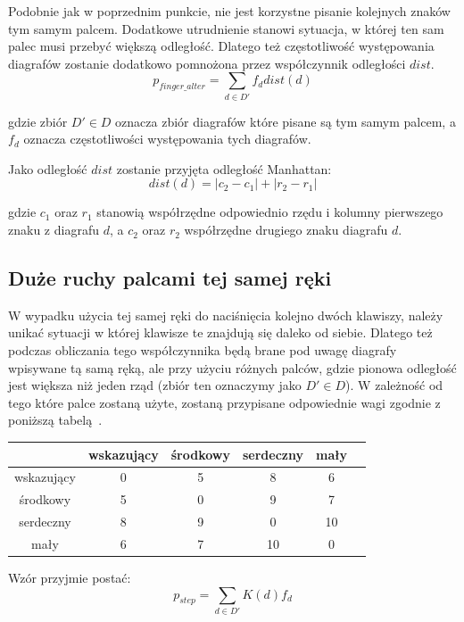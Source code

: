 \documentclass[brudnopis]{xmgr}
\begin{document}
Podobnie jak w poprzednim punkcie, nie jest korzystne pisanie kolejnych znaków tym samym palcem. Dodatkowe utrudnienie stanowi sytuacja, w której ten sam palec musi przebyć większą odległość. Dlatego też częstotliwość występowania diagrafów zostanie dodatkowo pomnożona przez współczynnik odległości $dist$.
$$ p_{finger\_alter} = \sum\limits_{d \in D'} f_d dist(d) $$

\noindent
gdzie zbiór $ D' \in D $ oznacza zbiór diagrafów które pisane są tym samym palcem, a $f_d$ oznacza częstotliwości występowania tych diagrafów.\newline

Jako odległość $dist$ zostanie przyjęta odległość Manhattan:
$$ dist(d) = |c_2 - c_1| + |r_2 - r_1| $$

gdzie $c_1$ oraz $r_1$ stanowią współrzędne odpowiednio rzędu i kolumny pierwszego znaku z diagrafu $d$, a $c_2$ oraz $r_2$ współrzędne drugiego znaku diagrafu $d$.


\subsection{Duże ruchy palcami tej samej ręki}

W wypadku użycia tej samej ręki do naciśnięcia kolejno dwóch klawiszy, należy unikać sytuacji w której klawisze te znajdują się daleko od siebie. Dlatego też podczas obliczania tego współczynnika będą brane pod uwagę diagrafy wpisywane tą samą ręką, ale przy użyciu różnych palców, gdzie pionowa odległość jest większa niż jeden rząd (zbiór ten oznaczymy jako $ D' \in D $). W zależność od tego które palce zostaną użyte, zostaną przypisane odpowiednie wagi zgodnie z poniższą tabelą~\cite{AntColony:2002:ACO}.\newline

\begin{tabular}{ c | c | c | c | c | c }
  & wskazujący & środkowy & serdeczny & mały \\
  \hline
  wskazujący & 0 & 5 & 8 & 6 \\
  środkowy & 5 & 0 & 9 & 7 \\
  serdeczny & 8 & 9 & 0 & 10 \\
  mały & 6 & 7 & 10 & 0 \\
\end{tabular}\newline\newline

Wzór przyjmie postać:
$$ p_{step} = \sum\limits_{d \in D'} K(d) f_d $$
\end{document}
